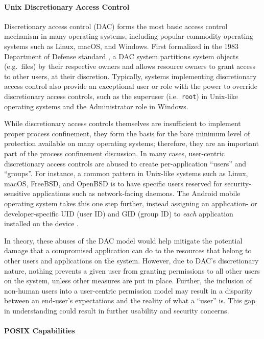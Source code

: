 \paragraph*{Unix Discretionary Access Control}

Discretionary access control (DAC) forms the most basic access control mechanism in many operating systems, including popular commodity operating systems such as Linux, macOS, and Windows.  First formalized in the 1983 Department of Defense standard \cite{orange_book}, a DAC system partitions system objects (e.g.~files) by their respective owners and allows resource owners to grant access to other users, at their discretion.  Typically, systems implementing discretionary access control also provide an exceptional user or role with the power to override discretionary access controls, such as the superuser (i.e.~\texttt{root}) in Unix-like operating systems and the Administrator role in Windows.

While discretionary access controls themselves are insufficient to implement proper process confinement, they form the basis for the bare minimum level of protection available on many operating systems; therefore, they are an important part of the process confinement discussion. In many cases, user-centric discretionary access controls are abused to create per-application \enquote{users} and \enquote{groups}. For instance, a common pattern in Unix-like systems such as Linux, macOS, FreeBSD, and OpenBSD is to have specific users reserved for security-sensitive applications such as network-facing daemons. The Android mobile operating system takes this one step further, instead assigning an application- or developer-specific UID (user ID) and GID (group ID) to \textit{each} application installed on the device \cite{android_security}.

In theory, these abuses of the DAC model would help mitigate the potential damage that a compromised application can do to the resources that belong to other users and applications on the system. However, due to DAC's discretionary nature, nothing prevents a given user from granting permissions to all other users on the system, unless other measures are put in place. Further, the inclusion of non-human users into a user-centric permission model may result in a disparity between an end-user's expectations and the reality of what a \enquote{user} is. This gap in understanding could result in further usability and security concerns.

\paragraph*{POSIX Capabilities}

